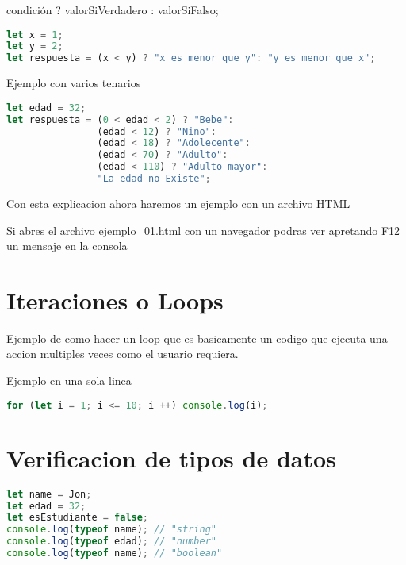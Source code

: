 condición ? valorSiVerdadero : valorSiFalso;

\begin{lstlisting}[language=JavaScript,caption={Ejemplo if else una linea}]
let x = 1;
let y = 2;
let respuesta = (x < y) ? "x es menor que y": "y es menor que x";
\end{lstlisting}
Ejemplo con varios tenarios

\begin{lstlisting}[language=JavaScript,caption={Ejemplo if else elif ternarios}]
let edad = 32;
let respuesta = (0 < edad < 2) ? "Bebe":
                (edad < 12) ? "Nino":
                (edad < 18) ? "Adolecente":
                (edad < 70) ? "Adulto":
                (edad < 110) ? "Adulto mayor":
                "La edad no Existe";
\end{lstlisting}
Con esta explicacion ahora haremos un ejemplo con un archivo HTML


Si abres el archivo ejemplo\_01.html con un navegador podras ver apretando F12 un mensaje en la consola
\section{Iteraciones o Loops}
Ejemplo de como hacer un loop que es basicamente un codigo que ejecuta una accion multiples veces como el usuario requiera.

Ejemplo en una sola linea

\begin{lstlisting}[language=JavaScript,caption={Ejemplo for una linea}]
for (let i = 1; i <= 10; i ++) console.log(i);
\end{lstlisting}
\section{Verificacion de tipos de datos}
\begin{lstlisting}[language=JavaScript,caption={Ejemplo tipos de datos}]
let name = Jon;
let edad = 32;
let esEstudiante = false;
console.log(typeof name); // "string"
console.log(typeof edad); // "number"
console.log(typeof name); // "boolean"
\end{lstlisting}



